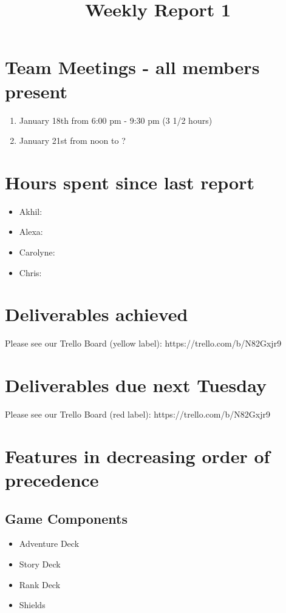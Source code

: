 \documentclass[a4paper,11pt]{article}
\begin{document}
\title{Weekly Report 1}
\maketitle

\section{Team Meetings - all members present}
\begin{enumerate}
\item January 18th from 6:00 pm - 9:30 pm (3 1/2 hours)
\item January 21st from noon to ?
\end{enumerate}

\section{Hours spent since last report}
\begin{itemize}
\item Akhil:
\item Alexa:
\item Carolyne: 
\item Chris:
\end{itemize}

\section{Deliverables achieved}
Please see our Trello Board (yellow label): https://trello.com/b/N82Gxjr9

\section{Deliverables due next Tuesday}
Please see our Trello Board (red label): https://trello.com/b/N82Gxjr9

\section{Features in decreasing order of precedence }

\subsection{Game Components}
\begin{itemize}
\item Adventure Deck 
\item Story Deck
\item Rank Deck
\item Shields
\end{itemize}
\end{document}
